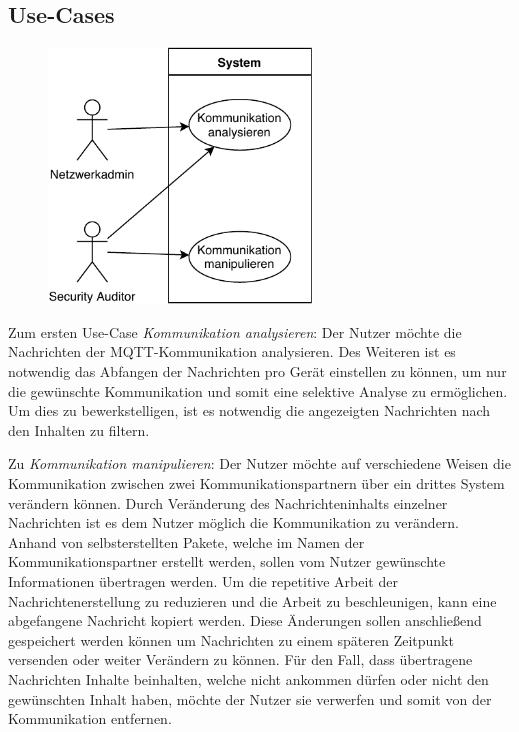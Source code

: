     \subsection{Use-Cases}
    \begin{figure}[h]%
    \centering
    \includegraphics[width=7cm]{tex/bilder/3_anforderungen/Use-Case.pdf}
    \label{fig:use-case}
\end{figure}
    
    Zum ersten Use-Case \emph{Kommunikation analysieren}:
    	Der Nutzer möchte die Nachrichten der \ac{MQTT}-Kommunikation analysieren.
    	Des Weiteren ist es notwendig das Abfangen der Nachrichten pro Gerät einstellen zu können, um nur die gewünschte Kommunikation und somit eine selektive Analyse zu ermöglichen.
    	Um dies zu bewerkstelligen, ist es notwendig die angezeigten Nachrichten nach den Inhalten zu filtern.
    	
    Zu \emph{Kommunikation manipulieren}:
    	Der Nutzer möchte auf verschiedene Weisen die Kommunikation zwischen zwei Kommunikationspartnern über ein drittes System verändern können.
    	Durch Veränderung des Nachrichteninhalts einzelner Nachrichten ist es dem Nutzer möglich die Kommunikation zu verändern.
    	Anhand von selbsterstellten Pakete, welche im Namen der Kommunikationspartner erstellt werden, sollen vom Nutzer gewünschte Informationen übertragen werden.
    	Um die repetitive Arbeit der Nachrichtenerstellung zu reduzieren und die Arbeit zu beschleunigen, kann eine abgefangene Nachricht kopiert werden.
    	Diese Änderungen sollen anschließend gespeichert werden können um Nachrichten zu einem späteren Zeitpunkt versenden oder weiter Verändern zu können.
    	Für den Fall, dass übertragene Nachrichten Inhalte beinhalten, welche nicht ankommen dürfen oder nicht den gewünschten Inhalt haben, möchte der Nutzer sie verwerfen und somit von der Kommunikation entfernen.

